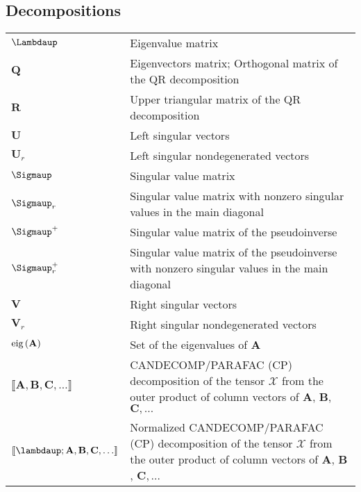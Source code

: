 \documentclass{article}
\newcommand{\eig}[1]{\ensuremath{\textnormal{eig}\left(#1\right)}} %
\begin{document}
\subsection{Decompositions}
\begin{xltabular}{\textwidth}{XX}
    \(\boldsymbol{\Lambdaup}\) & Eigenvalue matrix \cite{strangIntroductionLinearAlgebra1993}\\
    \(\mathbf{Q}\) & Eigenvectors matrix; Orthogonal matrix of the QR decomposition\cite{strangIntroductionLinearAlgebra1993}\\
    \(\mathbf{R}\) & Upper triangular matrix of the QR decomposition\cite{strangIntroductionLinearAlgebra1993}\\
    \(\mathbf{U}\) & Left singular vectors\cite{strangIntroductionLinearAlgebra1993}\\
    \(\mathbf{U}_r\) & Left singular nondegenerated vectors\\
    \(\boldsymbol{\Sigmaup}\) & Singular value matrix\\
    \(\boldsymbol{\Sigmaup}_r\) & Singular value matrix with nonzero singular values in the main diagonal\\
    \(\boldsymbol{\Sigmaup}^{+}\) & Singular value matrix of the pseudoinverse \cite{strangIntroductionLinearAlgebra1993}\\
    \(\boldsymbol{\Sigmaup}^{+}_r\) & Singular value matrix of the pseudoinverse with nonzero singular values in the main diagonal\\
    \(\mathbf{V}\) & Right singular vectors \cite{strangIntroductionLinearAlgebra1993}\\
    \(\mathbf{V}_r\) & Right singular nondegenerated vectors\\
    \(\eig{\mathbf{A}}\) & Set of the eigenvalues of \(\mathbf{A}\) \cite{chellappaSignalProcessingTheory2014,leon-garciaProbabilityStatisticsRandom2007,petersenMatrixCookbook2008}\\
    \(\llbracket \mathbf{A}, \mathbf{B}, \mathbf{C}, \dots \rrbracket\) & CANDECOMP/PARAFAC (CP) decomposition of the tensor \(\bm{\mathcal{X}}\) from the outer product of column vectors of \(\mathbf{A}\), \(\mathbf{B}\), \(\mathbf{C}, \dots\)\\
    \(\llbracket \boldsymbol{\lambdaup}; \mathbf{A}, \mathbf{B}, \mathbf{C}, \dots \rrbracket\) & Normalized CANDECOMP/PARAFAC (CP) decomposition of the tensor \(\bm{\mathcal{X}}\) from the outer product of column vectors of \(\mathbf{A}\), \(\mathbf{B}\), \(\mathbf{C}, \dots\)\\
\end{xltabular}
\end{document}
